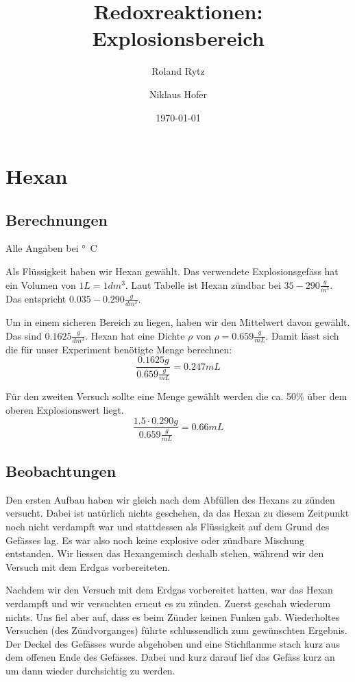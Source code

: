 \documentclass[11pt,paper=a4,final]{scrartcl}
\title{Redoxreaktionen: Explosionsbereich}
\author{Roland Rytz \and Niklaus Hofer}
\date{\today{}}
\begin{document}
\maketitle
\newpage
\tableofcontents
\section{Hexan}
\subsection{Berechnungen}
Alle Angaben bei \unit[20]{°C}

Als Fl\"ussigkeit haben wir Hexan gew\"ahlt. Das verwendete Explosionsgef\"ass
hat ein Volumen von \(1L = 1dm^3\). Laut Tabelle ist Hexan z\"undbar
bei \(35-290 \frac{g}{m^3}\). Das entspricht \(0.035 - 0.290 \frac{g}{dm^3}\).

Um in einem sicheren Bereich zu liegen, haben wir den Mittelwert davon
gew\"ahlt. Das sind \(0.1625 \frac{g}{dm^3}\).
Hexan hat eine Dichte \(\rho\) von \(\rho = 0.659 \frac{g}{mL}\). Damit l\"asst
sich die f\"ur unser Experiment ben\"otigte Menge berechnen:
\[ \frac{0.1625g}{0.659\frac{g}{mL}} = 0.247mL \]

F\"ur den zweiten Versuch sollte eine Menge gew\"ahlt werden die ca. 50\% \"uber
dem oberen Explosionswert liegt. 
\[ \frac{1.5 \cdot 0.290g}{0.659\frac{g}{mL}} = 0.66mL \]

\subsection{Beobachtungen}
Den ersten Aufbau haben wir gleich nach dem Abf\"ullen des Hexans zu z\"unden
versucht. Dabei ist nat\"urlich nichts geschehen, da das Hexan zu diesem
Zeitpunkt noch nicht verdampft war und stattdessen als Fl\"ussigkeit auf dem
Grund des Gef\"asses lag. Es war also noch keine explosive oder z\"undbare
Mischung entstanden. Wir liessen das Hexangemisch deshalb stehen, w\"ahrend wir
den Versuch mit dem Erdgas vorbereiteten.

Nachdem wir den Versuch mit dem Erdgas vorbereitet hatten, war das Hexan
verdampft und wir versuchten erneut es zu z\"unden. Zuerst geschah wiederum
nichts. Uns fiel aber auf, dass es beim Z\"under keinen Funken gab. Wiederholtes
Versuchen (des Z\"undvorganges) f\"uhrte schlussendlich zum gew\"unschten
Ergebnis. Der Deckel des Gef\"asses wurde abgehoben und eine Stichflamme stach
kurz aus dem offenen Ende des Gef\"asses. Dabei und kurz darauf lief das
Gef\"ass kurz an um dann wieder durchsichtig zu werden.
\end{document}
